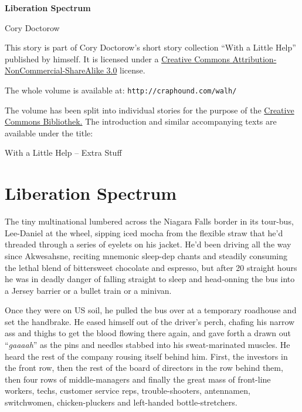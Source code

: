 


\raggedbottom

\begin{center}
\textbf{\huge\textsf{Liberation Spectrum}}

\medskip
Cory Doctorow

\end{center}

\bigskip

\begin{flushleft}
This story is part of Cory Doctorow’s short story collection
“With a Little Help” published by himself. It is licensed under a
\href{http://creativecommons.org/licenses/by-nc-sa/}
{Creative Commons Attribution-NonCommercial-ShareAlike 3.0} license.

\bigskip

The whole volume is available at:
\texttt{http://craphound.com/walh/}

\medskip

The volume has been split into individual stories for the purpose of the
\href{http://ccbib.org}{Creative Commons Bibliothek.}
The introduction and similar accompanying texts are available under the 
title:
\end{flushleft}
\begin{center}
With a Little Help -- Extra Stuff
\end{center}

\newpage

\section{Liberation Spectrum}

The tiny multinational lumbered across the Niagara Falls border in its 
tour-bus, Lee-Daniel at the wheel, sipping iced mocha from the flexible 
straw that he'd threaded through a series of eyelets on his jacket. 
He'd been driving all the way since Akwesahsne, reciting mnemonic 
sleep-dep chants and steadily consuming the lethal blend of bittersweet 
chocolate and espresso, but after 20 straight hours he was in deadly 
danger of falling straight to sleep and head-onning the bus into a 
Jersey barrier or a bullet train or a minivan.

Once they were on US soil, he pulled the bus over at a temporary 
roadhouse and set the handbrake. He eased himself out of the driver's 
perch, chafing his narrow ass and thighs to get the blood flowing there 
again, and gave forth a drawn out “\emph{gaaaah}” as the pins and 
needles stabbed into his sweat-marinated muscles. He heard the rest of 
the company rousing itself behind him. First, the investors in the 
front row, then the rest of the board of directors in the row behind 
them, then four rows of middle-managers and finally the great mass of 
front-line workers, techs, customer service reps, trouble-shooters, 
antennamen, switchwomen, chicken-pluckers and left-handed 
bottle-stretchers.

